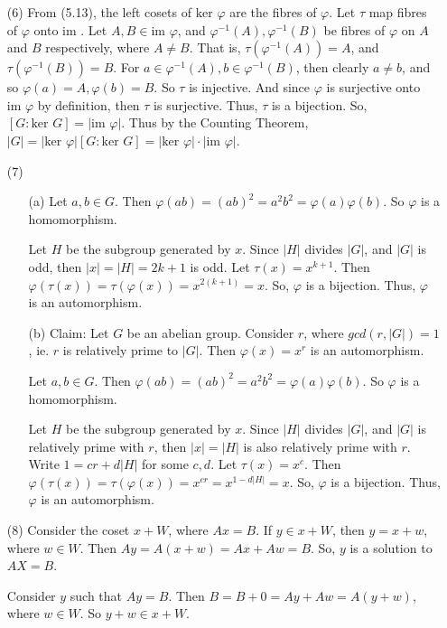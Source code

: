 \documentclass[12pt]{article}
\begin{document}
\begin{itemize}
\item[(6)]
From (5.13), the left cosets of $\text{ker }\varphi$ are the fibres of $\varphi$. Let $\tau$ map fibres of $\varphi$ onto $\text{im }$. Let $A, B \in \text{im }\varphi$, and $\varphi^{-1}(A), \varphi^{-1}(B)$ be fibres of $\varphi$ on $A$ and $B$ respectively, where $A \neq B$. That is, $\tau(\varphi^{-1}(A)) = A$, and $\tau(\varphi^{-1}(B)) = B$. For $a \in \varphi^{-1}(A), b \in \varphi^{-1}(B)$, then clearly $a \neq b$, and so $\varphi(a) = A, \varphi(b) = B$. So $\tau$ is injective. And since $\varphi$ is surjective onto $\text{im }\varphi$ by definition, then $\tau$ is surjective. Thus, $\tau$ is a bijection. So, $[G: \text{ker }G] = |\text{im }\varphi|$. Thus by the Counting Theorem, $|G| = |\text{ker }\varphi|[G: \text{ker }G] = |\text{ker }\varphi| \cdot |\text{im }\varphi|$.
\item[(7)]
\begin{itemize}
\item[(a)]
Let $a, b \in G$. Then $\varphi(ab) = (ab)^2 = a^2b^2 = \varphi(a)\varphi(b)$. So $\varphi$ is a homomorphism.

Let $H$ be the subgroup generated by $x$. Since $|H|$ divides $|G|$, and $|G|$ is odd, then $|x| = |H| = 2k + 1$ is odd. Let $\tau(x) = x^{k + 1}$. Then $\varphi(\tau(x)) = \tau(\varphi(x)) = x^{2(k+1)} = x$. So, $\varphi$ is a bijection. Thus, $\varphi$ is an automorphism.
\item[(b)]
Claim: Let $G$ be an abelian group. Consider $r$, where $gcd(r, |G|) = 1$, ie. $r$ is relatively prime to $|G|$. Then $\varphi(x) = x^r$ is an automorphism.

Let $a, b \in G$. Then $\varphi(ab) = (ab)^2 = a^2b^2 = \varphi(a)\varphi(b)$. So $\varphi$ is a homomorphism.

Let $H$ be the subgroup generated by $x$. Since $|H|$ divides $|G|$, and $|G|$ is relatively prime with $r$, then $|x| = |H|$ is also relatively prime with $r$. Write $1 = cr + d|H|$ for some $c, d$. Let $\tau(x) = x^{c}$. Then $\varphi(\tau(x)) = \tau(\varphi(x)) = x^{cr} = x^{1 - d|H|} = x$. So, $\varphi$ is a bijection. Thus, $\varphi$ is an automorphism.
\end{itemize}
\item[(8)]
Consider the coset $x+W$, where $Ax = B$. If $y \in x + W$, then $y = x+w$, where $w \in W$. Then $Ay = A(x+w) = Ax + Aw = B$. So, $y$ is a solution to $AX = B$.

Consider $y$ such that $Ay = B$. Then $B = B + 0 = Ay + Aw = A(y + w)$, where $w \in W$. So $y+w \in x+W$.


\end{itemize}
\end{document}

